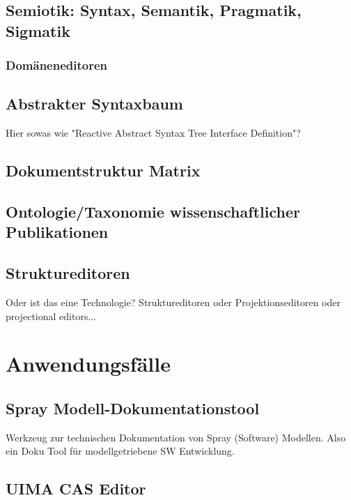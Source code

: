\section{Semiotik: Syntax, Semantik, Pragmatik, Sigmatik}

\subsection{Domäneneditoren}

\section{Abstrakter Syntaxbaum}

Hier sowas wie "Reactive Abstract Syntax Tree Interface Definition"?

\section{Dokumentstruktur Matrix}

\section{Ontologie/Taxonomie wissenschaftlicher Publikationen}

\section{Struktureditoren}

Oder ist das eine Technologie?
Struktureditoren oder Projektionseditoren oder projectional editors...



\chapter{Anwendungsfälle}

\section{Spray Modell-Dokumentationstool}

Werkzeug zur technischen Dokumentation von Spray (Software) Modellen.
Also ein Doku Tool für modellgetriebene SW Entwicklung.

\section{UIMA CAS Editor}

